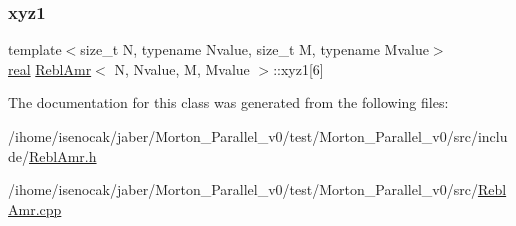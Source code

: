 \subsubsection{\texorpdfstring{xyz1}{xyz1}}
{\footnotesize\ttfamily template$<$size\+\_\+t N, typename Nvalue, size\+\_\+t M, typename Mvalue$>$ \\
\mbox{\hyperlink{definitions_8h_aedc0ad84d1e764530814f57ad931d02a}{real}} \mbox{\hyperlink{classReblAmr}{Rebl\+Amr}}$<$ N, Nvalue, M, Mvalue $>$\+::xyz1\mbox{[}6\mbox{]}\hspace{0.3cm}{\ttfamily [private]}}



The documentation for this class was generated from the following files\+:\begin{DoxyCompactItemize}
\item 
/ihome/isenocak/jaber/\+Morton\+\_\+\+Parallel\+\_\+v0/test/\+Morton\+\_\+\+Parallel\+\_\+v0/src/include/\mbox{\hyperlink{ReblAmr_8h}{Rebl\+Amr.\+h}}\item 
/ihome/isenocak/jaber/\+Morton\+\_\+\+Parallel\+\_\+v0/test/\+Morton\+\_\+\+Parallel\+\_\+v0/src/\mbox{\hyperlink{ReblAmr_8cpp}{Rebl\+Amr.\+cpp}}\end{DoxyCompactItemize}

